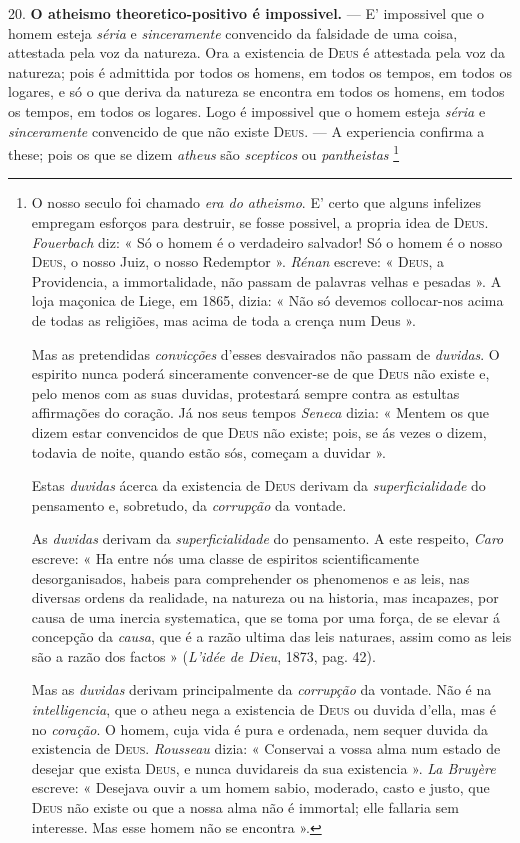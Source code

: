 20. \textbf{O atheismo theoretico-positivo é impossivel.} --- E' impossivel que o homem esteja \emph{séria} e \emph{sinceramente} convencido da falsidade de uma coisa, attestada pela voz da natureza. Ora a existencia de \textsc{Deus} é attestada pela voz da natureza; pois é admittida por todos os homens, em todos os tempos, em todos os logares, e só o que deriva da natureza se encontra em todos os homens, em todos os tempos, em todos os logares. Logo é impossivel que o homem esteja \emph{séria} e \emph{sinceramente} convencido de que não existe \textsc{Deus}. --- A experiencia confirma a these; pois os que se dizem \emph{atheus} são \emph{scepticos} ou \emph{pantheistas} \footnote{O nosso seculo foi chamado \emph{era do atheismo}. E' certo que alguns infelizes empregam esforços para destruir, se fosse possivel, a propria idea de \textsc{Deus}. \emph{Fouerbach} diz: « Só o homem é o verdadeiro salvador! Só o homem é o nosso \textsc{Deus}, o nosso Juiz, o nosso Redemptor ». \emph{Rénan} escreve: « \textsc{Deus}, a Providencia, a immortalidade, não passam de palavras velhas e pesadas ». A loja maçonica de Liege, em 1865, dizia: « Não só devemos collocar-nos acima de todas as religiões, mas acima de toda a crença num Deus ».\par Mas as pretendidas \emph{convicções} d'esses desvairados não passam de \emph{duvidas}. O espirito nunca poderá sinceramente convencer-se de que \textsc{Deus} não existe e, pelo menos com as suas duvidas, protestará sempre contra as estultas affirmações do coração. Já nos seus tempos \emph{Seneca} dizia: « Mentem os que dizem estar convencidos de que \textsc{Deus} não existe; pois, se ás vezes o dizem, todavia de noite, quando estão sós, começam a duvidar ».\par Estas \emph{duvidas} ácerca da existencia de \textsc{Deus} derivam da \emph{superficialidade} do pensamento e, sobretudo, da \emph{corrupção} da vontade.\par As \emph{duvidas} derivam da \emph{superficialidade} do pensamento. A este respeito, \emph{Caro} escreve: « Ha entre nós uma classe de espiritos scientificamente desorganisados, habeis para comprehender os phenomenos e as leis, nas diversas ordens da realidade, na natureza ou na historia, mas incapazes, por causa de uma inercia systematica, que se toma por uma força, de se elevar á concepção da \emph{causa}, que é a razão ultima das leis naturaes, assim como as leis são a razão dos factos » (\emph{L'idée de Dieu}, 1873, pag. 42).\par Mas as \emph{duvidas} derivam principalmente da \emph{corrupção} da vontade. Não é na \emph{intelligencia}, que o atheu nega a existencia de \textsc{Deus} ou duvida d'ella, mas é no \emph{coração}. O homem, cuja vida é pura e ordenada, nem sequer duvida da existencia de \textsc{Deus}. \emph{Rousseau} dizia: « Conservai a vossa alma num estado de desejar que exista \textsc{Deus}, e nunca duvidareis da sua existencia ». \emph{La Bruyère} escreve: « Desejava ouvir a um homem sabio, moderado, casto e justo, que \textsc{Deus} não existe ou que a nossa alma não é immortal; elle fallaria sem interesse. Mas esse homem não se encontra ».}

